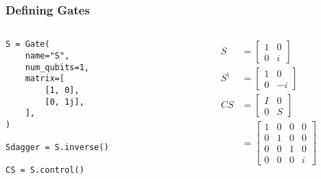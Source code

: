 \documentclass{beamer}
\newcommand{\verbatimsize}{\footnotesize}
\begin{document}
\begin{frame}[fragile]
    \frametitle{Defining Gates}
    \begin{columns}
        \begin{column}{0.3\textwidth}
            \verbatimsize
\begin{verbatim}
S = Gate(
    name="S",
    num_qubits=1,
    matrix=[
        [1, 0],
        [0, 1j],
    ],
)

Sdagger = S.inverse()

CS = S.control()
\end{verbatim}
        \end{column}
        \begin{column}{0.3\textwidth}
            \begin{align*}
                S & = \begin{bmatrix}
                    1 & 0 \\
                    0 & i
                \end{bmatrix} \\
                S^\dag & = \begin{bmatrix}
                    1 & 0 \\
                    0 & -i
                \end{bmatrix} \\
                CS & = \begin{bmatrix}
                    I & 0 \\
                    0 & S
                \end{bmatrix} \\
                & = \begin{bmatrix}
                    1 & 0 & 0 & 0 \\
                    0 & 1 & 0 & 0 \\
                    0 & 0 & 1 & 0 \\
                    0 & 0 & 0 & i
                \end{bmatrix}
            \end{align*}
        \end{column}
    \end{columns}
\end{frame}
\end{document}
